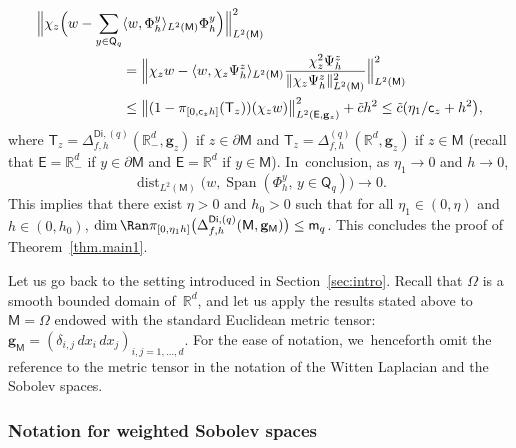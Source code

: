 \documentclass[10pt]{amsart}
\DeclareMathOperator{\dist}{dist}
\DeclareMathOperator{\Span}{Span}
\newcommand{\mbf}[1]{\mathbf{#1}}
\let\lp\langle
\let\rp\rangle
\let\pa\partial
\theoremstyle{plain}
\theoremstyle{definition}
\begin{document}
\begin{align*}
\Big \Vert \chi_z\Bigl(w- \sum_{y \in \mathsf Q_q}& \lp w, \Phi_h^y\rp _{L^2(\mathsf M)} \Phi_h^y\Bigr) \Big \Vert_{L^2(\mathsf M)}^2 \\ &= \Big \Vert \chi_z w - \lp w, \chi_z \Psi_h^z\rp _{L^2(\mathsf M)} \frac{\chi_z^2 \Psi_h^z }{ \Vert \chi_z\Psi_h^z \Vert_{L^2(\mathsf M)}^2}\Big \Vert_{L^2(\mathsf M)}^2 \\
&\le \big \Vert (1-\pi_{[0,\mathsf c_zh]} (\mathsf T_z))(\chi_z w)\big \Vert_{L^2(\mathsf E,\mbf g_z)}^2 + \tilde{c} h^2\le \tilde{c}(\eta_1/\mathsf c_z +h^2 \bigr),
\end{align*}
where $\mathsf T_z=\Delta_{f,h}^{\mathsf{Di},(q)}(\mathbb R^d_-,\mbf g_z)$ if $z\in \pa \mathsf M$ and $\mathsf T_z=\Delta_{f,h}^{(q)}(\mathbb R^d,\mbf g_z)$ if $z\in \mathsf M$ (recall that $\mathsf E=\mathbb R^d_-$ if $y\in \pa \mathsf M$ and $\mathsf E=\mathbb R^d$ if $ y\in \mathsf M$). In~conclusion, as $\eta_1\to 0$ and $h\to 0$,
\[
\dist_{L^2(\mathsf M)}\bigl(w, \Span (\Phi_h^y, \, y\in \mathsf Q_q) \bigr)\to 0.
\]
This implies that there exist $\eta>0$ and $h_0>0$ such that for all $\eta_1\in (0,\eta)$ and $h\in (0,h_0)$, $\dim \Ran \pi_{[0,\eta_1h]}\bigl(\Delta_{f,h}^{\mathsf{Di},(q)}(\mathsf M,\mbf g_{\mathsf M})\bigr)\le \mathsf m_q$. This concludes the proof of Theorem~\ref{thm.main1}.

\label{sec.seclienwitten}
Let us go back to the setting introduced in Section~\ref{sec:intro}.
Recall that $\Omega$ is a smooth bounded domain of~$\mathbb R^d$,
and let us apply the results stated above to $\mathsf M=\Omega$
endowed with the standard Euclidean metric tensor: $\mbf
g_{\mathsf M} =(\delta_{i,j} \, dx_i \, dx_j)_{i,j=1,\ldots,d}$. For
the ease of notation, we~henceforth omit the reference to the metric tensor in the notation of the Witten Laplacian and the Sobolev spaces.

\subsubsection{Notation for weighted Sobolev spaces}
\label{sec.not-Sw}
\end{document}
